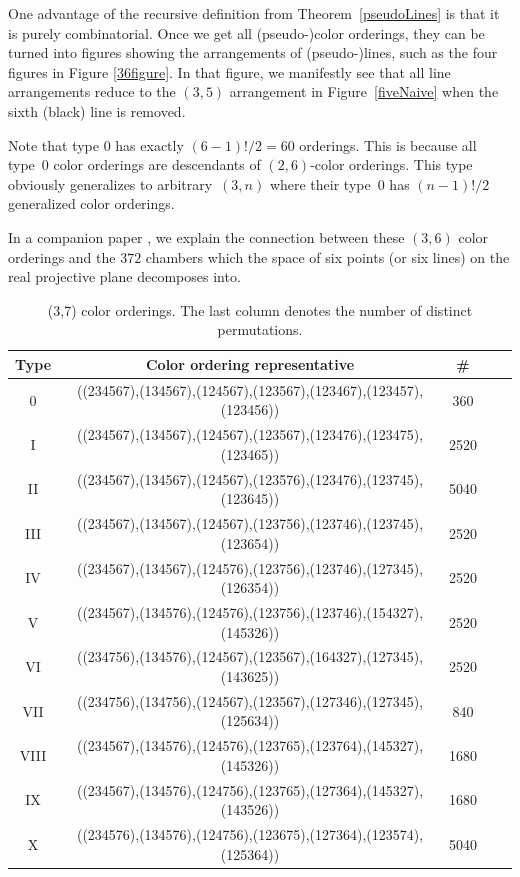 \documentclass[pdftex]{sigma}
\theoremstyle{definition}
\numberwithin{equation}{section}
\begin{document}
One advantage of the recursive definition from Theorem~\ref{pseudoLines} is that it is purely combinatorial. Once we get all
(pseudo-)color orderings, they can be turned into figures showing the arrangements of (pseudo-)lines, such as the four figures in Figure \ref{36figure}. In that figure, we manifestly see that all line arrangements reduce to the $(3,5)$ arrangement in Figure~\ref{fiveNaive} when the sixth (black) line is removed.

Note that type 0 has exactly $(6-1)!/2=60$ orderings. This is because all type~0 color orderings are descendants of $(2,6)$-color orderings. This type obviously generalizes to arbitrary~$(3,n)$ where their type~0 has $(n-1)!/2$ generalized color orderings.

In a companion paper \cite{Cachazo:2023ltw}, we explain the connection between these $(3,6)$ color orderings and the $372$ chambers which the space of six points (or six lines) on the real projective plane decomposes into.

\begin{table}[!htb]\renewcommand{\arraystretch}{1.2}
 \centering
\begin{tabular}{|c|c|c|c|c|}\hline
Type & Color ordering representative & \# \\ \hline
0 &
((234567),(134567),(124567),(123567),(123467),(123457),(123456))
& 360
\\
I &
((234567),(134567),(124567),(123567),(123476),(123475),(123465))
& 2520
\\
II &
((234567),(134567),(124567),(123576),(123476),(123745),(123645))
&
5040
\\
III &
((234567),(134567),(124567),(123756),(123746),(123745),(123654))
&
2520
\\
IV &
((234567),(134567),(124576),(123756),(123746),(127345),(126354))
& 2520
\\
V &
((234567),(134576),(124576),(123756),(123746),(154327),(145326))
&
 2520
\\
VI &
((234756),(134576),(124567),(123567),(164327),(127345),(143625))
&
 2520
\\
VII &
((234756),(134756),(124567),(123567),(127346),(127345),(125634))
&
840
\\
VIII &
((234567),(134576),(124576),(123765),(123764),(145327),(145326))
&
1680
\\
IX &
((234567),(134576),(124756),(123765),(127364),(145327),(143526))
& 1680
\\
X &
((234576),(134576),(124756),(123675),(127364),(123574),(125364))
& 5040
\\ \hline
\end{tabular}
 \caption{(3,7) color orderings.
 The last column denotes the number of distinct permutations.}\label{table37}
\end{table}
\end{document}
